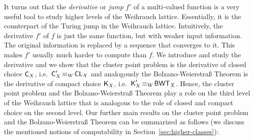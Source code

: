 \documentclass[a4paper]{amsart}
\def\BWT{\text{\rm\sffamily BWT}}
\def\C{\mbox{\rm\sffamily C}}
\def\K{\text{\rm\sffamily K}}
\def\CL{\text{\rm\sffamily CL}}
\def\equivW{\mathop{\equiv_{\mathrm{W}}}}
\theoremstyle{definition}
\begin{document}
It turns out that the {\em derivative} or {\em jump} $f'$ of a multi-valued function is a very useful tool
to study higher levels of the Weihrauch lattice. Essentially, it is the counterpart of the Turing jump in the Weihrauch
lattice. Intuitively, the derivative $f'$ of $f$ is just the same function, but with weaker input information. The original
information is replaced by a sequence that converges to it. This makes $f'$ usually much harder to compute than $f$.
We introduce and study the derivative and we show that the cluster point problem is the derivative
of closed choice $\C_X$, i.e.\ $\C_X'\equivW\CL_X$ and analogously the Bolzano-Weierstra\ss{} Theorem is the derivative
of compact choice $\K_X$, i.e.\ $\K_X'\equivW\BWT_X$. Hence, the cluster point problem and the Bolzano-Weierstra\ss{} Theorem
play a role on the third level of the Weihrauch lattice that is analogous to the role of closed and compact choice on the second level. 
Our further main results on the cluster point problem and the Bolzano-Weierstra\ss{} Theorem can be summarized as follows
(we discuss the mentioned notions of computability in Section~\ref{sec:higher-classes}):
\end{document}

